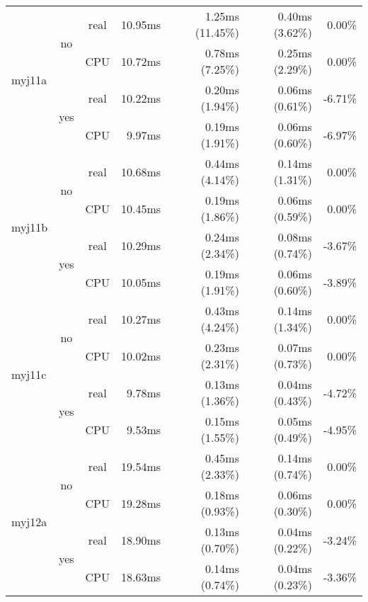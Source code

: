 \documentclass[en]{pracamgr}
\begin{document}
\begin{small}
\begin{longtable}{|l|c|c|r|r|r|r|}
\hline
\multirow{4}{*}{myj11a}   & \multirow{2}{*}{no}  & real & 10.95ms & 1.25ms (11.45\%) & 0.40ms (3.62\%) & 0.00\% \\*
                          &                      & CPU  & 10.72ms & 0.78ms (7.25\%) & 0.25ms (2.29\%) & 0.00\% \\*
                          \cline{2-7}
                          & \multirow{2}{*}{yes} & real & 10.22ms & 0.20ms (1.94\%) & 0.06ms (0.61\%) & -6.71\% \\*
                          &                      & CPU  & 9.97ms & 0.19ms (1.91\%) & 0.06ms (0.60\%) & -6.97\% \\
\hline
\multirow{4}{*}{myj11b}   & \multirow{2}{*}{no}  & real & 10.68ms & 0.44ms (4.14\%) & 0.14ms (1.31\%) & 0.00\% \\*
                          &                      & CPU  & 10.45ms & 0.19ms (1.86\%) & 0.06ms (0.59\%) & 0.00\% \\*
                          \cline{2-7}
                          & \multirow{2}{*}{yes} & real & 10.29ms & 0.24ms (2.34\%) & 0.08ms (0.74\%) & -3.67\% \\*
                          &                      & CPU  & 10.05ms & 0.19ms (1.91\%) & 0.06ms (0.60\%) & -3.89\% \\
\hline
\multirow{4}{*}{myj11c}   & \multirow{2}{*}{no}  & real & 10.27ms & 0.43ms (4.24\%) & 0.14ms (1.34\%) & 0.00\% \\*
                          &                      & CPU  & 10.02ms & 0.23ms (2.31\%) & 0.07ms (0.73\%) & 0.00\% \\*
                          \cline{2-7}
                          & \multirow{2}{*}{yes} & real & 9.78ms & 0.13ms (1.36\%) & 0.04ms (0.43\%) & -4.72\% \\*
                          &                      & CPU  & 9.53ms & 0.15ms (1.55\%) & 0.05ms (0.49\%) & -4.95\% \\
\hline
\multirow{4}{*}{myj12a}   & \multirow{2}{*}{no}  & real & 19.54ms & 0.45ms (2.33\%) & 0.14ms (0.74\%) & 0.00\% \\*
                          &                      & CPU  & 19.28ms & 0.18ms (0.93\%) & 0.06ms (0.30\%) & 0.00\% \\*
                          \cline{2-7}
                          & \multirow{2}{*}{yes} & real & 18.90ms & 0.13ms (0.70\%) & 0.04ms (0.22\%) & -3.24\% \\*
                          &                      & CPU  & 18.63ms & 0.14ms (0.74\%) & 0.04ms (0.23\%) & -3.36\% \\

\end{longtable}
\end{small}
\end{document}
